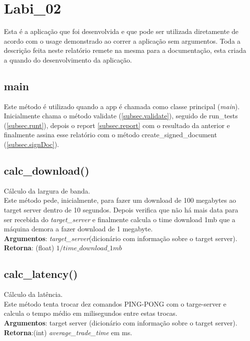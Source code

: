 \documentclass{report}
\begin{document}
\section{Labi\_02}
\hspace{5mm}Esta é a aplicação que foi desenvolvida e que pode ser utilizada diretamente de acordo com o usage demonstrado ao correr a aplicação sem argumentos. Toda a descrição feita neste relatório remete na mesma para a documentação, esta criada a quando do desenvolvimento da aplicação.

\subsection{main}
Este método é utilizado quando a app é chamada como classe principal (\textit{main}).
Inicialmente chama o método validate (\autoref{subsec.validate}), seguido de run\_tests (\autoref{subsec.runt}), depois o report \autoref{subsec.report} com o resultado da anterior e finalmente assina esse relatório com o método create\_signed\_document (\autoref{subsec.signDoc}).

\subsection{calc\_download()}
Cálculo da largura de banda.\\
Este método pede, inicialmente, para fazer um download de 100 megabytes ao target server dentro de 10 segundos. Depois verifica que não há mais data para ser recebida do \textit{target\_server} e finalmente calcula o time download 1mb que a máquina demora a fazer download de 1 megabyte.\\ 
\textbf{Argumentos}: \textit{target\_server}(dicionário com informação sobre o target server). 
\textbf{Retorna}: (float) $1/\textit{time\_download\_1mb}$

\subsection{calc\_latency()}
\hspace{5mm}Cálculo da latência.\\ 
Este método tenta trocar dez comandos PING-PONG com o targe-server e calcula o tempo médio em milisegundos entre estas trocas.\\
\hspace{5mm}\textbf{Argumentos}: target server (dicionário com informação sobre o target server). 
\hspace{5mm}\textbf{Retorna}:(int) \textit{average\_trade\_time} em ms.
\end{document}
